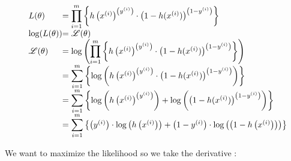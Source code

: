 \[
	\begin{array}{ l@{} l@{} }
	L(\theta) & =
	{ \displaystyle \prod_{i=1}^{m} }
	\left\{
		h
		\left(x^{(i)}\right)
		^{
			\left(
				y^{(i)}
			\right)
		}
		\cdot
		\left(
			1 - h(x^{(i)})
		\right)
		^{
			\left(
				1 - y^{(i)}
			\right)
		}
	\right\}
	\\
	\log(L(\theta)) & = \mathscr{L}(\theta) \\ 
	\mathscr{L}(\theta)
	& =
	\log \left( 
	{ \displaystyle \prod_{i=1}^{m} }
	\left\{
		h
		\left(x^{(i)}\right)
		^{
			\left(
				y^{(i)}
			\right)
		} 
		\cdot 
		\left(
			1 - h(x^{(i)})
		\right)
		^{
			\left(
				1 - y^{(i)}
			\right)
		} 
	\right\} 
	\right) 
	\\ 
	& = 
	{ \displaystyle \sum_{i=1}^{m} } \left\{ 
		\log \left( 
			h
			\left(x^{(i)}\right)
			^{
				\left(
					y^{(i)}
				\right)
			} 
			\cdot 
			\left(
				1 - h(x^{(i)})
			\right)
			^{
				\left(
					1 - y^{(i)}
				\right)
			} 
		\right) 
	\right\} 
	\\ 
	& = 
	{ \displaystyle \sum_{i=1}^{m} } \left\{ 
		\log \left( 
			h
			\left(x^{(i)}\right)
			^{
				\left(
					y^{(i)}
				\right)
			} 
		\right) 
		+ 
		\log \left( 
			\left(
				1 - h(x^{(i)})
			\right)
			^{
				\left(
					1 - y^{(i)}
				\right)
			} 
		\right) 
	\right\} 
	\\ 
	& = 
	{ \displaystyle \sum_{i=1}^{m} } \left\{ 
		\left(
			y^{(i)}
		\right) 
		\cdot 
		\log \left( 
		h \left(
			x^{(i)}
		\right) 
		\right) 
		+ 
		\left(
			1 - y^{(i)}
		\right) 
		\cdot 
		\log \left( 
		\left(
			1 -
			h \left(
				x^{(i)}
			\right) 
		\right) 
		\right) 
	\right\} 
	\end{array}
\]

We want to maximize the likelihood so we take the derivative :



